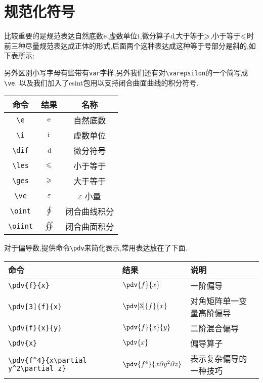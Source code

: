\documentclass[lang=cn,12pt,scheme=chinese,mode=simple,black]{elegantbook}
\begin{document}
\section*{规范化符号}
比较重要的是规范表达自然底数$\mathrm{e}$,虚数单位$\mathrm{i}$,微分算子$\operatorname{d\!}$,大于等于$\geqslant$,小于等于$\leqslant$时
前三种尽量规范表达成正体的形式,后面两个这种表达成这种等于号部分是斜的,如下表所示;

另外区别小写字母有些带有\verb|var|字样,另外我们还有对\verb|\varepsilon|的一个简写成\verb|\ve|.
以及我们加入了esint包用以支持闭合曲面曲线的积分符号.

\begin{center}
\setlength{\tabcolsep}{10pt}
\begin{tabular}{|c|c|c|}
\hline
\textbf{命令} & \textbf{结果} & \textbf{名称}\\
\hline
\verb|\e| & $\mathrm{e}$ & 自然底数 \\
\verb|\i| & $\mathrm{i}$ & 虚数单位 \\
\verb|\dif| & $\operatorname{d\!}$ & 微分符号 \\
\verb|\les| & $\leqslant$ & 小于等于 \\
\verb|\ges| & $\geqslant$ & 大于等于 \\
\verb|\ve| & $\varepsilon$ & $\varepsilon$ 小量 \\
\verb|\oint| & $\oint$ & 闭合曲线积分 \\
\verb|\oiint| & $\oiint$ & 闭合曲面积分 \\
\hline
\end{tabular}
\end{center}

对于偏导数,提供命令\verb|\pdv|来简化表示,常用表达放在了下面.
\begin{center}
\renewcommand{\arraystretch}{1.4}
\setlength{\tabcolsep}{10pt}
\begin{tabular}{|l|l|l|}
\hline
\textbf{命令} & \textbf{结果} & \textbf{说明} \\
\hline
\verb|\pdv{f}{x}| & $\pdv{f}{x}$ & 一阶偏导 \\
\verb|\pdv[3]{f}{x}| & $\pdv[3]{f}{x}$ & 对角矩阵单一变量高阶偏导 \\
\verb|\pdv{f}{x}{y}| & $\pdv{f}{x}{y}$ & 二阶混合偏导 \\
\verb|\pdv{x}| & $\pdv{x}$ & 偏导算子 \\
\verb|\pdv{f^4}{x\partial y^2\partial z}| & $\pdv{f^4}{x\partial y^2\partial z}$ & 表示复杂偏导的一种技巧 \\

\hline
\end{tabular}
\end{center}
\end{document}
